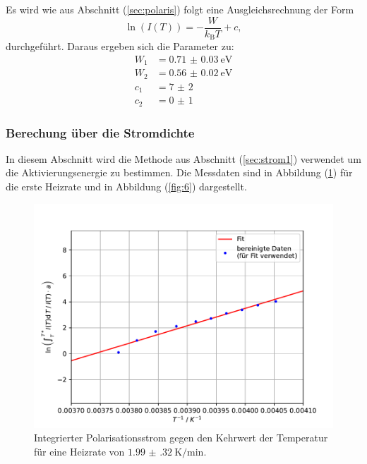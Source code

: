 \FloatBarrier
Es wird wie aus Abschnitt (\ref{sec:polaris}) folgt eine Ausgleichsrechnung der Form
\begin{equation}
    \label{eqn:lin}
    \ln(I(T)) = -\dfrac{W}{k_\mathrm{B} T} + c,
\end{equation}
durchgeführt.
Daraus ergeben sich die Parameter zu:
\begin{align*}
    W_\mathrm{1} &= \SI{0.71(3)}{\electronvolt} \\
    W_\mathrm{2} &= \SI{0.56(2)}{\electronvolt} \\
    c_\mathrm{1} &= \num{7(2)} \\
    c_\mathrm{2} &= \num{0(1)}
\end{align*}
\subsubsection{Berechung über die Stromdichte}
In diesem Abschnitt wird die Methode aus Abschnitt (\ref{sec:strom1}) verwendet um die Aktivierungsenergie zu bestimmen. Die Messdaten sind in Abbildung (\ref{fig:5}) für die erste Heizrate und in Abbildung (\ref{fig:6}) dargestellt.
\begin{figure}[h!]
  \centering
  \includegraphics[scale=0.8]{fig/plot5.pdf}
  \caption{Integrierter Polarisationsstrom gegen den Kehrwert der Temperatur für eine Heizrate von $\SI{1.99(32)}{\kelvin\per\minute}$.}
  \label{fig:5}
\end{figure}
